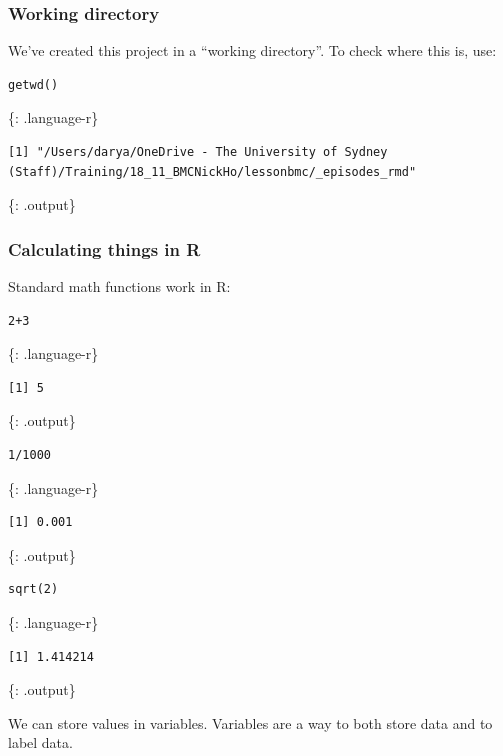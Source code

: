 \documentclass[]{article}
\begin{document}
\subsubsection{Working directory}\label{working-directory}

We've created this project in a ``working directory''. To check where
this is, use:

\begin{verbatim}
getwd()
\end{verbatim}

\{: .language-r\}

\begin{verbatim}
[1] "/Users/darya/OneDrive - The University of Sydney (Staff)/Training/18_11_BMCNickHo/lessonbmc/_episodes_rmd"
\end{verbatim}

\{: .output\}

\subsubsection{Calculating things in R}\label{calculating-things-in-r}

Standard math functions work in R:

\begin{verbatim}
2+3
\end{verbatim}

\{: .language-r\}

\begin{verbatim}
[1] 5
\end{verbatim}

\{: .output\}

\begin{verbatim}
1/1000
\end{verbatim}

\{: .language-r\}

\begin{verbatim}
[1] 0.001
\end{verbatim}

\{: .output\}

\begin{verbatim}
sqrt(2)
\end{verbatim}

\{: .language-r\}

\begin{verbatim}
[1] 1.414214
\end{verbatim}

\{: .output\}

We can store values in variables. Variables are a way to both store data
and to label data.
\end{document}
